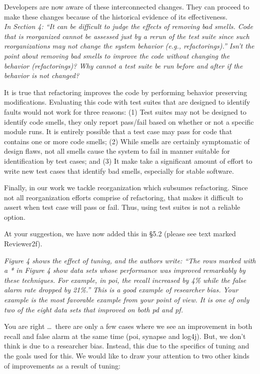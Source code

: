 \documentclass[twocolumn,5p]{elsarticle}
\newcommand{\tion}[1]{\S#1}
\newcommand{\review}[1]{\noindent\textit{#1\\}}
\theoremstyle{break}
\begin{document}
Developers are now aware of these interconnected changes. They can proceed 
to make these changes because of the historical evidence of its 
effectiveness.\\


\review{In Section 4: ``It can be difficult to judge the effects of 
	removing 
	bad smells. Code that is reorganized cannot be assessed just by a rerun of 
	the test suite since such reorganizations may not change the system 
	behavior (e.g., refactorings).'' Isn't the point about removing bad smells 
	to improve the code without changing the behavior (refactorings)? Why 
	cannot a test suite be run before and after if the behavior is not changed?}

It is true that refactoring improves the code by performing behavior 
preserving modifications. Evaluating this code with test suites that are 
designed to 
identify faults would not work for three reasons: (1) Test suites may not 
be 
designed to identify code smells, they only report pass/fail based on 
whether or not a specific module runs. It is entirely possible that a test 
case may pass for code that contains one or more code smells; (2) While 
smells are certainly symptomatic of design flaws, not all smells cause the 
system to fail in manner suitable for identification by test cases; and (3) 
It make take a significant amount of effort to write new test cases that 
identify bad smells, especially for stable software.

Finally, in our work we tackle reorganization which subsumes refactoring. 
Since not all reorganization efforts comprise of refactoring, that makes it 
difficult to assert when test case will pass or fail. Thus, using test 
suites is not a reliable option. 

At your suggestion, we have now added this in \tion{5.2} (please see text 
marked {\color{steel} Reviewer2f}).\\

\balance	

\review{Figure 4 shows the effect of tuning, and the authors write: ``The 
	rows marked with a * in Figure 4 show data sets whose performance was 
	improved remarkably  by  these  techniques. For example, in poi, the recall 
	increased by 4\% while the false alarm rate dropped by 21\%.'' This is a 
	good example of researcher bias. Your example is the most favorable example 
	from your point of view. It is one of only two of the eight data sets that 
	improved on both pd and pf.}

You are right \ldots ~there are only a few cases where we see an 
improvement 
in both recall and false alarm at the same time (poi, synapse and log4j). 
But, we don't think is due to a researcher bias. Instead, this due to the 
specifics of tuning and the goals used for this. We would like to draw your 
attention to two other kinds of improvements as 
a result of tuning: 
\end{document}
